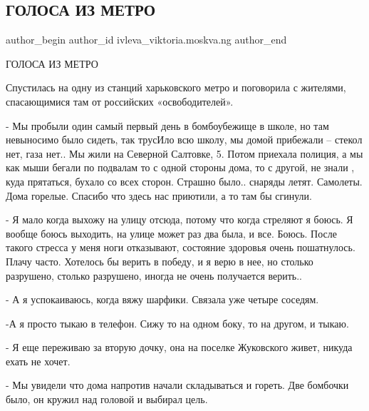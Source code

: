 
 
 
 
 
 
\subsection{ГОЛОСА ИЗ МЕТРО}
\label{sec:22_04_2022.fb.ivleva_viktoria.moskva.ng.1.golosa_iz_metro}
 
\ifcmt
 author_begin
   author_id ivleva_viktoria.moskva.ng
 author_end
\fi

ГОЛОСА ИЗ МЕТРО

Спустилась на одну из станций харьковского метро и поговорила с жителями,
спасающимися там от российских «освободителей».

- Мы пробыли один самый первый день в бомбоубежище в школе, но там невыносимо
было сидеть, так трусИло всю школу, мы домой прибежали – стекол нет, газа нет..
Мы жили на Северной Салтовке, 5. Потом приехала полиция, а мы как мыши бегали
по подвалам то с одной стороны дома, то с другой, не знали , куда прятаться,
бухало со всех сторон. Страшно было.. снаряды летят. Самолеты. Дома горелые.
Спасибо что здесь нас приютили, а то там  бы сгинули.

- Я мало когда выхожу на улицу отсюда, потому что когда стреляют я боюсь. Я
вообще боюсь выходить, на улице может раз два была, и все. Боюсь. После такого
стресса у меня ноги отказывают, состояние здоровья очень пошатнулось. Плачу
часто. Хотелось бы верить в победу, и я верю в нее, но   столько разрушено,
столько разрушено, иногда не очень получается верить.. 

- А я успокаиваюсь, когда вяжу шарфики. Связала уже четыре соседям.

-А я просто тыкаю в телефон. Сижу то на одном боку, то на другом, и тыкаю.

- Я еще переживаю за вторую дочку, она на поселке Жуковского живет, никуда
ехать не хочет.

- Мы увидели что дома напротив начали складываться  и гореть. Две бомбочки
было, он кружил над головой и выбирал цель.

